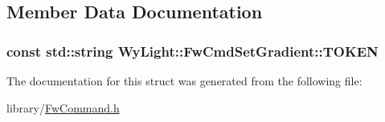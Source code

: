 \subsection{Member Data Documentation}
\hypertarget{struct_wy_light_1_1_fw_cmd_set_gradient_a2e00c35a708bdd084af9fa486bdbd83e}{
\subsubsection[{T\-O\-K\-E\-N}]{\setlength{\rightskip}{0pt plus 5cm}const std\-::string Wy\-Light\-::\-Fw\-Cmd\-Set\-Gradient\-::\-T\-O\-K\-E\-N\hspace{0.3cm}{\ttfamily [static]}}}\label{struct_wy_light_1_1_fw_cmd_set_gradient_a2e00c35a708bdd084af9fa486bdbd83e}


The documentation for this struct was generated from the following file\-:\begin{DoxyCompactItemize}
\item 
library/\hyperlink{_fw_command_8h}{Fw\-Command.\-h}\end{DoxyCompactItemize}

